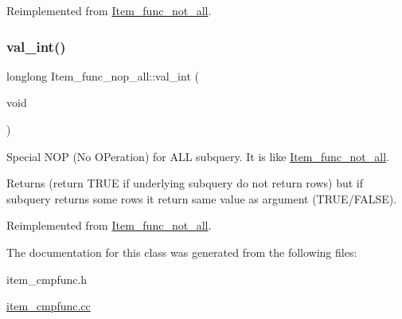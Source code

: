 Reimplemented from \mbox{\hyperlink{classItem__func__not__all_a5efa58fa1c7361846ec917da2e416c8d}{Item\+\_\+func\+\_\+not\+\_\+all}}.

\mbox{\label{classItem__func__nop__all_a83df49e5ddb63299f2eea0960d6d80f1}} 
\subsubsection{\texorpdfstring{val\+\_\+int()}{val\_int()}}
{\footnotesize\ttfamily longlong Item\+\_\+func\+\_\+nop\+\_\+all\+::val\+\_\+int (\begin{DoxyParamCaption}\item[{void}]{ }\end{DoxyParamCaption})\hspace{0.3cm}{\ttfamily [virtual]}}

Special N\+OP (No O\+Peration) for A\+LL subquery. It is like \mbox{\hyperlink{classItem__func__not__all}{Item\+\_\+func\+\_\+not\+\_\+all}}.

\begin{DoxyReturn}{Returns}
(return T\+R\+UE if underlying subquery do not return rows) but if subquery returns some rows it return same value as argument (T\+R\+U\+E/\+F\+A\+L\+SE). 
\end{DoxyReturn}


Reimplemented from \mbox{\hyperlink{classItem__func__not__all_a8c295f113fceeb1d2f97cf12b0414a40}{Item\+\_\+func\+\_\+not\+\_\+all}}.



The documentation for this class was generated from the following files\+:\begin{DoxyCompactItemize}
\item 
item\+\_\+cmpfunc.\+h\item 
\mbox{\hyperlink{item__cmpfunc_8cc}{item\+\_\+cmpfunc.\+cc}}\end{DoxyCompactItemize}
